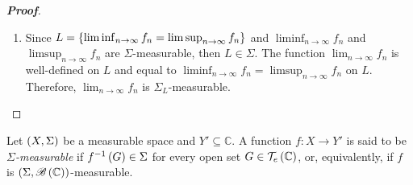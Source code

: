\begin{proposition}
\begin{proof}[\rm\textbf{Proof}]
\begin{enumerate}
      \begin{equation}
        \begin{split}
          \inf_{n\in\mathbb{N}}{f_n} & =-\sup_{n\in\mathbb{N}}{\pr{-f_n}},\\
          \liminf_{n\to\infty}{f_n} & =\sup_{n\in\mathbb{N}}{\inf_{m\in\mathbb{N},m\geq n}{f_m}},\\
          \limsup_{n\to\infty}{f_n} & =\inf_{n\in\mathbb{N}}{\sup_{m\in\mathbb{N},m\geq n}{f_m}}.
        \end{split}
      \end{equation}
      \item Since $L=\left\{\liminf_{n\to\infty}{f_n}=\limsup_{n\to\infty}{f_n}\right\}$ and $\liminf_{n\to\infty}{f_n}$ and $\limsup_{n\to\infty}{f_n}$ are $\Sigma$-measurable, then $L\in\Sigma$. The function $\lim_{n\to\infty}{f_n}$ is well-defined on $L$ and equal to $\liminf_{n\to\infty}{f_n}=\limsup_{n\to\infty}{f_n}$ on $L$. Therefore, $\lim_{n\to\infty}{f_n}$ is $\Sigma_L$-measurable.
    \end{enumerate}
  \end{proof}
\end{proposition}

\begin{definition}
  Let $\left(X,\Sigma\right)$ be a measurable space and $Y'\subseteq\mathbb{C}$. A function $f:X\rightarrow Y'$ is said to be \textit{$\Sigma$-measurable} if $f^{-1}\left(G\right)\in\Sigma$ for every open set $G\in\mathcal{T}_e\left(\mathbb{C}\right)$, or, equivalently, if $f$ is $\left(\Sigma,\mathscr{B}\left(\mathbb{C}\right)\right)$-measurable.
\end{definition}

